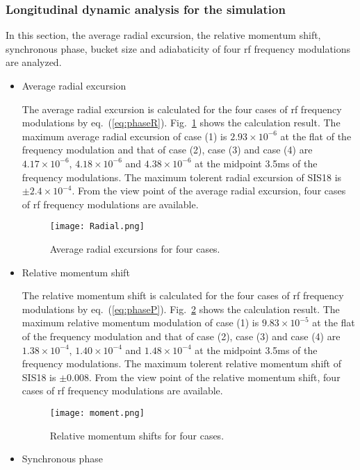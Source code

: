\subsubsection{Longitudinal dynamic analysis for the simulation}
In this section, the average radial excursion, the relative momentum shift, synchronous phase, bucket size and adiabaticity of four rf frequency modulations are analyzed. 
\begin{itemize}
\item Average radial excursion

The average radial excursion is calculated for the four cases of rf frequency modulations by eq.~(\ref{eq:phaseR}). Fig.~\ref{radial} shows the calculation result. The maximum average radial excursion of case (1) is $2.93\times10^{-6}$ at the flat of the frequency modulation and that of case (2), case (3) and case (4) are $ 4.17\times10^{-6}$, $4.18\times 10^{-6}$ and $4.38\times 10^{-6}$ at the midpoint 3.5ms of the frequency modulations. The maximum tolerent radial excursion of SIS18 is $\pm 2.4\times10^{-4}$. From the view point of the average radial excursion, four cases of rf frequency modulations are available.
\begin{figure}[!htb]
   \centering   
   \texttt{[image: Radial.png]}
   \caption{Average radial excursions for four cases.}
   \label{radial}
\end{figure}

\item Relative momentum shift

The relative momentum shift is calculated for the four cases of rf frequency modulations by eq.~(\ref{eq:phaseP}). Fig.~\ref{moment} shows the calculation result. The maximum relative momentum modulation of case (1) is $9.83\times 10^{-5}$ at the flat of the frequency modulation and that of case (2), case (3) and case (4) are $1.38 \times10^{-4}$, $1.40\times 10^{-4}$ and $1.48\times 10^{-4}$ at the midpoint 3.5ms of the frequency modulations. The maximum tolerent relative momentum shift of SIS18 is $\pm 0.008$. From the view point of the relative momentum shift, four cases of rf frequency modulations are available.
\begin{figure}[!htb]
   \centering   
   \texttt{[image: moment.png]}
   \caption{Relative momentum shifts for four cases.}
   \label{moment}
\end{figure}
\item Synchronous phase


\end{itemize}
